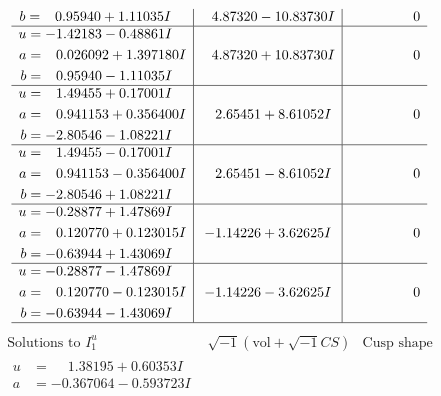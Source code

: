 \documentclass[1p]{elsarticle_modified}
\theoremstyle{definition}
\newcommand{\I}{\sqrt{-1}}
\begin{document}
$$\begin{array}{c|c|c}
\begin{aligned}
b &= \phantom{-}0.95940 + 1.11035 I\end{aligned}
 & \phantom{-}4.87320 - 10.83730 I & \phantom{-0.000000 } 0 \\ \hline\begin{aligned}
u &= -1.42183 - 0.48861 I \\
a &= \phantom{-}0.026092 + 1.397180 I \\
b &= \phantom{-}0.95940 - 1.11035 I\end{aligned}
 & \phantom{-}4.87320 + 10.83730 I & \phantom{-0.000000 } 0 \\ \hline\begin{aligned}
u &= \phantom{-}1.49455 + 0.17001 I \\
a &= \phantom{-}0.941153 + 0.356400 I \\
b &= -2.80546 - 1.08221 I\end{aligned}
 & \phantom{-}2.65451 + 8.61052 I & \phantom{-0.000000 } 0 \\ \hline\begin{aligned}
u &= \phantom{-}1.49455 - 0.17001 I \\
a &= \phantom{-}0.941153 - 0.356400 I \\
b &= -2.80546 + 1.08221 I\end{aligned}
 & \phantom{-}2.65451 - 8.61052 I & \phantom{-0.000000 } 0 \\ \hline\begin{aligned}
u &= -0.28877 + 1.47869 I \\
a &= \phantom{-}0.120770 + 0.123015 I \\
b &= -0.63944 + 1.43069 I\end{aligned}
 & -1.14226 + 3.62625 I & \phantom{-0.000000 } 0 \\ \hline\begin{aligned}
u &= -0.28877 - 1.47869 I \\
a &= \phantom{-}0.120770 - 0.123015 I \\
b &= -0.63944 - 1.43069 I\end{aligned}
 & -1.14226 - 3.62625 I & \phantom{-0.000000 } 0\\
 \hline 
 \end{array}$$\newpage$$\begin{array}{c|c|c}  
\text{Solutions to }I^u_{1}& \I (\text{vol} + \sqrt{-1}CS) & \text{Cusp shape}\\
 \hline 
\begin{aligned}
u &= \phantom{-}1.38195 + 0.60353 I \\
a &= -0.367064 - 0.593723 I \\

\end{aligned}
\end{array}$$
\end{document}
